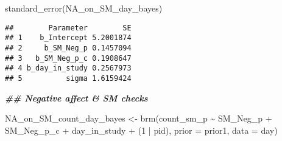 \documentclass[
]{article}
\newenvironment{Shaded}{\begin{snugshade}}{\end{snugshade}}
\newcommand{\AttributeTok}[1]{\textcolor[rgb]{0.77,0.63,0.00}{#1}}
\newcommand{\DecValTok}[1]{\textcolor[rgb]{0.00,0.00,0.81}{#1}}
\newcommand{\DocumentationTok}[1]{\textcolor[rgb]{0.56,0.35,0.01}{\textbf{\textit{#1}}}}
\newcommand{\FunctionTok}[1]{\textcolor[rgb]{0.00,0.00,0.00}{#1}}
\newcommand{\NormalTok}[1]{#1}
\newcommand{\OtherTok}[1]{\textcolor[rgb]{0.56,0.35,0.01}{#1}}
\newcommand{\SpecialCharTok}[1]{\textcolor[rgb]{0.00,0.00,0.00}{#1}}
\begin{document}
\begin{Shaded}
\begin{Highlighting}[]
\FunctionTok{standard\_error}\NormalTok{(NA\_on\_SM\_day\_bayes)}
\end{Highlighting}
\end{Shaded}

\begin{verbatim}
##        Parameter        SE
## 1    b_Intercept 5.2001874
## 2     b_SM_Neg_p 0.1457094
## 3   b_SM_Neg_p_c 0.1908647
## 4 b_day_in_study 0.2567973
## 5          sigma 1.6159424
\end{verbatim}

\begin{Shaded}
\begin{Highlighting}[]
\DocumentationTok{\#\# Negative affect \& SM checks}

\NormalTok{NA\_on\_SM\_count\_day\_bayes  }\OtherTok{\textless{}{-}} \FunctionTok{brm}\NormalTok{(count\_sm\_p }\SpecialCharTok{\textasciitilde{}}\NormalTok{ SM\_Neg\_p }\SpecialCharTok{+}\NormalTok{ SM\_Neg\_p\_c }\SpecialCharTok{+}\NormalTok{ day\_in\_study }\SpecialCharTok{+}\NormalTok{ (}\DecValTok{1} \SpecialCharTok{|}\NormalTok{ pid), }\AttributeTok{prior =}\NormalTok{ prior1, }\AttributeTok{data =}\NormalTok{ day)}
\end{Highlighting}
\end{Shaded}
\end{document}

